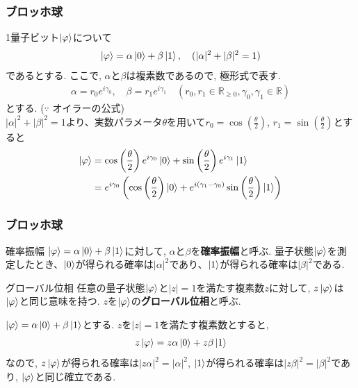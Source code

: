 \documentclass[9pt]{beamer}
\begin{document}
\begin{frame}
  \frametitle{ブロッホ球}
  1量子ビット$\ket{\varphi}$について\begin{align}
    \ket{\varphi} = \alpha \ket{0} + \beta \ket{1}, \quad (|\alpha|^2 + |\beta|^2 = 1)
  \end{align}
  であるとする. ここで, $\alpha$と$\beta$は複素数であるので, 極形式で表す.
  \begin{align}
    \alpha = r_0 e^{i \gamma_0}, \quad \beta = r_1 e^{i \gamma_1} \quad (r_0, r_1 \in \mathbb{R}_{\geq 0}, \gamma_0, \gamma_1 \in \mathbb{R})
  \end{align}
  とする. ($\because$ オイラーの公式)  \\
  $|\alpha|^2 + |\beta|^2 = 1$より、実数パラメータ$\theta$を用いて$r_0 = \cos \left( \frac{\theta}{2} \right)$, $r_1 = \sin \left( \frac{\theta}{2} \right)$とすると
  \begin{align}
    \ket{\varphi} &= \cos \left( \frac{\theta}{2} \right) e^{i \gamma_0} \ket{0} + \sin \left( \frac{\theta}{2} \right) e^{i \gamma_1} \ket{1} \\
    &= e^{i \gamma_0} \left( \cos \left( \frac{\theta}{2} \right) \ket{0} + e^{i (\gamma_1 - \gamma_0)} \sin \left( \frac{\theta}{2} \right) \ket{1} \right)
  \end{align}
\end{frame}

\begin{frame}
  \frametitle{ブロッホ球}
  \begin{block}{確率振幅}
    $\ket{\varphi} = \alpha \ket{0} + \beta \ket{1}$に対して, $\alpha$と$\beta$を\textbf{確率振幅}と呼ぶ.
    量子状態$\ket{\varphi}$を測定したとき、$\ket{0}$が得られる確率は$|\alpha|^2$であり、$\ket{1}$が得られる確率は$|\beta|^2$である.
  \end{block}
  \begin{block}{グローバル位相}
    任意の量子状態$\ket{\varphi}$と$|z| = 1$を満たす複素数$z$に対して, $z \ket{\varphi}$は$\ket{\varphi}$と同じ意味を持つ.
    $z$を$\ket{\varphi}$の\textbf{グローバル位相}と呼ぶ.
  \end{block}
  $\ket{\varphi} = \alpha \ket{0} + \beta \ket{1}$とする. $z$を$|z| = 1$を満たす複素数とすると, 
  \begin{align}
    z \ket{\varphi} = z \alpha \ket{0} + z \beta \ket{1}
  \end{align}
  なので, $z \ket{\varphi}$が得られる確率は$|z \alpha|^2 = |\alpha|^2$, $\ket{1}$が得られる確率は$|z \beta|^2 = |\beta|^2$であり, $\ket{\varphi}$と同じ確立である.
\end{frame}
\end{document}
